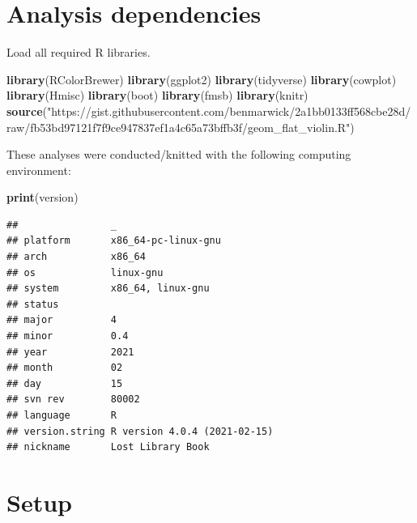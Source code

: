 \documentclass[]{book}
\newenvironment{Shaded}{\begin{snugshade}}{\end{snugshade}}
\newcommand{\KeywordTok}[1]{\textcolor[rgb]{0.13,0.29,0.53}{\textbf{#1}}}
\newcommand{\NormalTok}[1]{#1}
\newcommand{\StringTok}[1]{\textcolor[rgb]{0.31,0.60,0.02}{#1}}
\begin{document}
\hypertarget{analysis-dependencies-3}{%
\section{Analysis dependencies}\label{analysis-dependencies-3}}

Load all required R libraries.

\begin{Shaded}
\begin{Highlighting}[]
\KeywordTok{library}\NormalTok{(RColorBrewer)}
\KeywordTok{library}\NormalTok{(ggplot2)}
\KeywordTok{library}\NormalTok{(tidyverse)}
\KeywordTok{library}\NormalTok{(cowplot)}
\KeywordTok{library}\NormalTok{(Hmisc)}
\KeywordTok{library}\NormalTok{(boot)}
\KeywordTok{library}\NormalTok{(fmsb)}
\KeywordTok{library}\NormalTok{(knitr)}
\KeywordTok{source}\NormalTok{(}\StringTok{"https://gist.githubusercontent.com/benmarwick/2a1bb0133ff568cbe28d/raw/fb53bd97121f7f9ce947837ef1a4c65a73bffb3f/geom_flat_violin.R"}\NormalTok{)}
\end{Highlighting}
\end{Shaded}

These analyses were conducted/knitted with the following computing environment:

\begin{Shaded}
\begin{Highlighting}[]
\KeywordTok{print}\NormalTok{(version)}
\end{Highlighting}
\end{Shaded}

\begin{verbatim}
##                _                           
## platform       x86_64-pc-linux-gnu         
## arch           x86_64                      
## os             linux-gnu                   
## system         x86_64, linux-gnu           
## status                                     
## major          4                           
## minor          0.4                         
## year           2021                        
## month          02                          
## day            15                          
## svn rev        80002                       
## language       R                           
## version.string R version 4.0.4 (2021-02-15)
## nickname       Lost Library Book
\end{verbatim}

\hypertarget{setup-3}{%
\section{Setup}\label{setup-3}}
\end{document}

